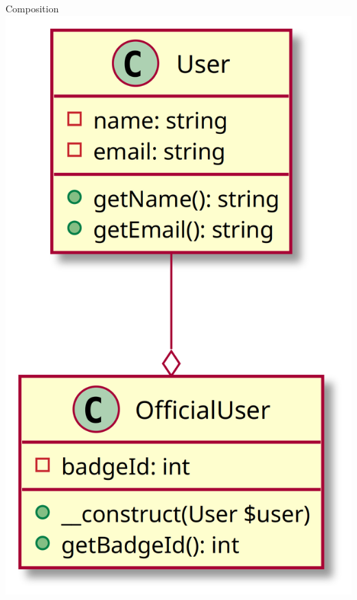 \begin{frame}[fragile,c]
    \noindent\begin{minipage}{.45\textwidth}
        \begin{center}
            \large{Composition}
            \includegraphics[height=.75\textheight]{src/session--composition-and-inheritance/resources/Composition.png}
        \end{center}
    \end{minipage}\hfill
    \begin{minipage}{.10\textwidth}
        \pause
    \end{minipage}

\end{frame}
